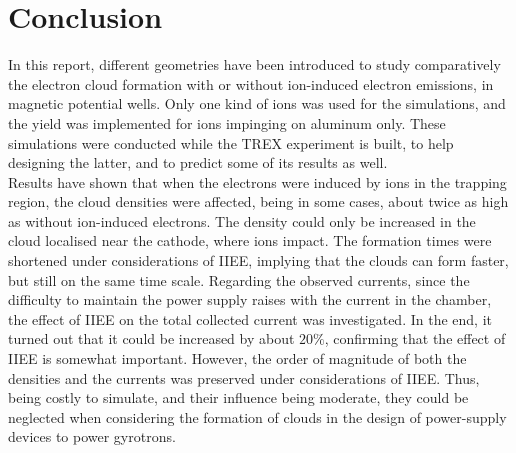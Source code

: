 \section{Conclusion}
In this report, different geometries have been introduced to study comparatively the electron cloud formation with or without ion-induced electron emissions, in magnetic potential wells. Only one kind of ions was used for the simulations, and the yield was implemented for ions impinging on aluminum only. These simulations were conducted while the TREX experiment is built, to help designing the latter, and to predict some of its results as well.\\

\noindent Results have shown that when the electrons were induced by ions in the trapping region, the cloud densities were  affected, being in some cases, about twice as high as without ion-induced electrons. The density could only be increased in the cloud localised near the cathode, where ions impact. The formation times were shortened under considerations of IIEE, implying that the clouds can form faster, but still on the same time scale. Regarding the observed currents, since the difficulty to maintain the power supply raises with the current in the chamber, the effect of IIEE on the total collected current was investigated. In the end, it turned out that it could be increased by about $20\%$, confirming that the effect of IIEE is somewhat important. However, the order of magnitude of both the densities and the currents was preserved under considerations of IIEE. Thus, being costly to simulate, and their influence being moderate, they could be neglected when considering the formation of clouds in the design of power-supply devices to power gyrotrons. 

